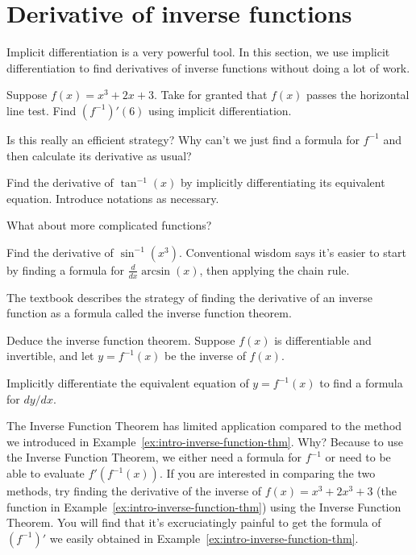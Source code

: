 \documentclass[../main.tex]{subfiles}
\begin{document}
 \section{Derivative of inverse functions}
Implicit differentiation is a very powerful tool. In this section, we use implicit differentiation to find derivatives of inverse functions without doing a lot of work. 

\begin{example} \label{ex:intro-inverse-function-thm}
  Suppose \(f(x) = x^{3} + 2x + 3\). Take for granted that \(f(x)\) passes the horizontal line test. Find \((f^{-1})'(6)\) using implicit differentiation.

\end{example}
\faComment{} Is this really an efficient strategy? Why can't we just find a formula for \(f^{-1}\) and then calculate its derivative as usual?
\clearpage

\begin{example} \label{ex:derivative-of-arctan}
  Find the derivative of \(\tan^{-1}(x)\) by implicitly differentiating its equivalent equation.  
  Introduce notations as necessary.

\end{example}

What about more complicated functions? 
\begin{example} \label{ex:derivative-of-arcsin}
  Find the derivative of \(\sin^{-1}(x^{3})\).  Conventional wisdom says it's easier to start by finding a formula for \(\frac{d}{dx} \arcsin(x)\), then applying the chain rule.

\end{example}
\clearpage

The textbook describes the strategy of finding the derivative of an inverse function as a formula called the inverse function theorem. 
\begin{example}
  Deduce the inverse function theorem.  Suppose \(f(x)\) is differentiable and invertible, and let \(y = f^{-1}(x)\) be the inverse of \(f(x)\).

  Implicitly differentiate the equivalent equation of \(y = f^{-1}(x)\) to find a formula for \(dy/dx\).

\end{example}

\faExclamationTriangle{} The Inverse Function Theorem has limited application compared to the method we introduced in Example~\ref{ex:intro-inverse-function-thm}. Why? Because to use the Inverse Function Theorem, we either need a formula for \(f^{-1}\) or need to be able to evaluate \(f'(f^{-1}(x))\). If you are interested in comparing the two methods, try finding the derivative of the inverse of \(f(x) = x^{3} + 2x^{3} + 3\) (the function in Example~\ref{ex:intro-inverse-function-thm}) using the Inverse Function Theorem. You will find that it's excruciatingly painful to get the formula of \((f^{-1})'\) we easily obtained in Example~\ref{ex:intro-inverse-function-thm}.
\end{document}
